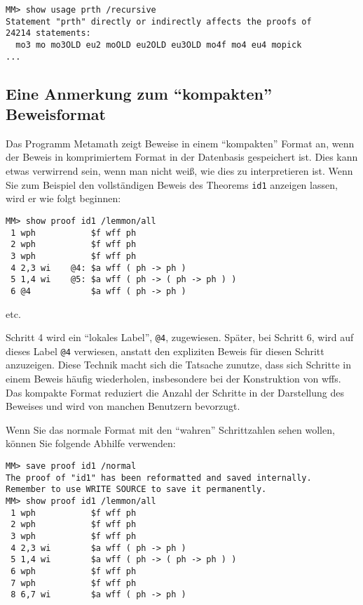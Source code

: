 \begin{verbatim}
MM> show usage prth /recursive
Statement "prth" directly or indirectly affects the proofs of
24214 statements:
  mo3 mo mo3OLD eu2 moOLD eu2OLD eu3OLD mo4f mo4 eu4 mopick
...
\end{verbatim}

\subsection{Eine Anmerkung zum "`kompakten"'\texorpdfstring{\\}{} Beweis\-format}

Das Programm Metamath zeigt Beweise in einem "`kompakten"' Format an, wenn der Beweis in komprimiertem Format in der Datenbasis gespeichert ist.  Dies kann etwas verwirrend sein, wenn man nicht weiß, wie dies zu interpretieren ist. Wenn Sie zum Beispiel den vollständigen Beweis des Theorems \texttt{id1} anzeigen lassen, wird er wie folgt beginnen:

\begin{verbatim}
MM> show proof id1 /lemmon/all
 1 wph           $f wff ph
 2 wph           $f wff ph
 3 wph           $f wff ph
 4 2,3 wi    @4: $a wff ( ph -> ph )
 5 1,4 wi    @5: $a wff ( ph -> ( ph -> ph ) )
 6 @4            $a wff ( ph -> ph )
\end{verbatim}

\begin{center}
{etc.}
\end{center}

Schritt 4 wird ein "`lokales Label"',  \texttt{@4}, zugewiesen. Später, bei Schritt 6, wird auf dieses Label \texttt{@4} verwiesen, anstatt den expliziten Beweis für diesen Schritt anzuzeigen.  Diese Technik macht sich die Tatsache zunutze, dass sich Schritte in einem Beweis häufig wiederholen, insbesondere bei der Konstruktion von wffs.  Das kompakte Format reduziert die Anzahl der Schritte in der Darstellung des Beweises und wird von manchen Benutzern bevorzugt.

Wenn Sie das normale Format mit den "`wahren"' Schrittzahlen sehen wollen, können Sie folgende Abhilfe verwenden:

\begin{verbatim}
MM> save proof id1 /normal
The proof of "id1" has been reformatted and saved internally.
Remember to use WRITE SOURCE to save it permanently.
MM> show proof id1 /lemmon/all
 1 wph           $f wff ph
 2 wph           $f wff ph
 3 wph           $f wff ph
 4 2,3 wi        $a wff ( ph -> ph )
 5 1,4 wi        $a wff ( ph -> ( ph -> ph ) )
 6 wph           $f wff ph
 7 wph           $f wff ph
 8 6,7 wi        $a wff ( ph -> ph )
\end{verbatim}

